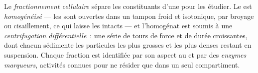 \begin{definition}\label{def:b1:cell-unit-of-life:fractionation}
Le \emph{fractionnement cellulaire}
sépare les constituants d'une  pour les étudier. Le  est
\emph{homogénéisé} --- les  sont ouvertes dans
un tampon froid et isotonique, par broyage ou cisaillement, ce qui
laisse les  intacts --- et l'homogénat est soumis à une
\emph{centrifugation différentielle}~:
une série de tours de force et de durée croissantes, dont chacun
sédimente les particules les plus grosses et les plus denses restant en
suspension. Chaque fraction est identifiée par son aspect au  et par des \emph{enzymes marqueurs},
activités connues pour ne résider que dans un seul compartiment.
\end{definition}

